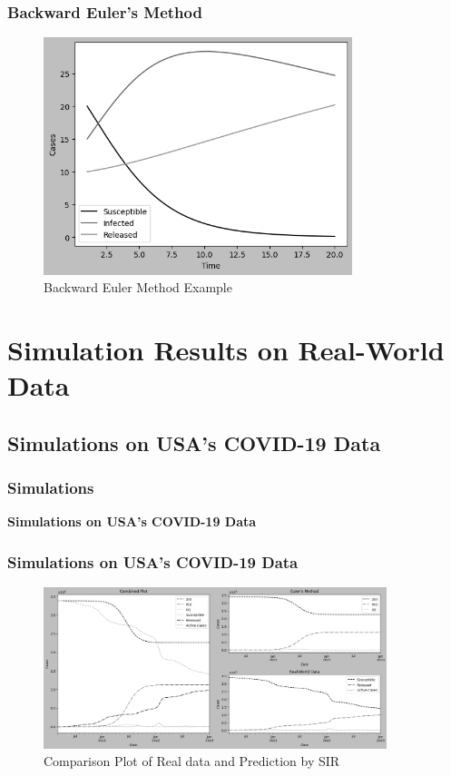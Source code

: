 \documentclass{beamer}
\begin{document}
\begin{frame}\frametitle{Backward Euler's Method}
    \begin{figure}
        \caption{Backward Euler Method Example}
        \centering
        \includegraphics[width=9cm]{Figure_BackwardsEuler.png}
    \end{figure}
\end{frame}

\section{Simulation Results on Real-World Data}
\subsection{Simulations on USA's COVID-19 Data}
\begin{frame}\frametitle{Simulations}
    \begin{center}
        \textbf{Simulations on USA's COVID-19 Data}
    \end{center}
\end{frame}

\begin{frame}\frametitle{Simulations on USA's COVID-19 Data}
    \begin{figure}
        \caption{Comparison Plot of Real data and Prediction by SIR}
        \centering
        \includegraphics[width=10cm]{Figure_USAPredict.png}
    \end{figure}
\end{frame}
\end{document}
